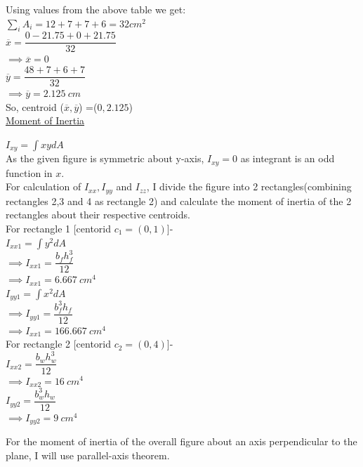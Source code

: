 \documentclass{article}
\begin{document}
\noindent Using values from the above table we get:\\ 

\noindent$\sum_i A_i= 12+7+7+6= 32 cm^2$\\

\noindent $\overline{x} = \dfrac{0-21.75+0+21.75}{32}$\\
$\implies \overline{x} = 0$\\

\noindent $\overline{y} = \dfrac{48+7+6+7}{32}$
\\ 

\noindent$\implies \overline{y} = 2.125 \ cm$\\

\noindent So, centroid ($\overline{x},\overline{y} $) =($0,2.125 $)\\

\noindent \underline{Moment of Inertia}

\noindent $ I_{xy}= \int xydA$\\
As the given figure is symmetric about y-axis, $I_{xy}=0$ as integrant is an odd function in $x$.\\

\noindent For calculation of $I_{xx}, I_{yy}$ and $I_{zz}$, I divide the figure into 2 rectangles(combining rectangles 2,3 and 4 as rectangle 2) and calculate the moment of inertia of the 2 rectangles about their respective centroids.\\

\noindent For rectangle 1 [centorid $c_1=(0,1)$]-\\
$I_{xx1}=\int y^2dA$\\
$\implies I_{xx1}=\dfrac{b_fh_f^3}{12}$\\
$\implies I_{xx1}=6.667\ cm^4$\\

\noindent $I_{yy1}=\int x^2dA$\\
$\implies I_{yy1}=\dfrac{b_f^3h_f}{12}$\\
$\implies I_{xx1}=166.667\ cm^4$\\

\noindent For rectangle 2 [centorid $c_2=(0,4)$]-\\
$I_{xx2}= \dfrac{b_wh_w^3}{12}$\\
$\implies I_{xx2}= 16\ cm^4$\\
$ I_{yy2}=\dfrac{b_w^3h_w}{12} $\\
$\implies I_{yy2}= 9\ cm^4$

\noindent For the moment of inertia of the overall figure about an axis perpendicular to the plane, I will use parallel-axis theorem.\\
\end{document}
